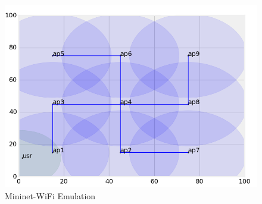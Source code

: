 \begin{figure}
	\centering
	\includegraphics[width=0.9\linewidth]{figs/mininetwifigraph.png}
	\vspace{\baselineskip}
	\caption{Mininet-WiFi Emulation}
	\label{fig:mininettopology}
\end{figure}

